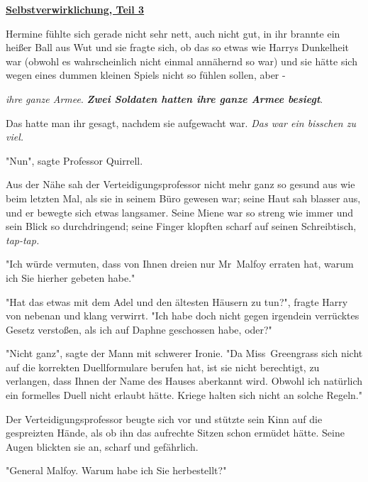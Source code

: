 

\hypertarget{selbstverwirklichung-teil-3}{%

\textbf{\uline{Selbstverwirklichung, Teil 3}}

Hermine fühlte sich gerade nicht sehr nett, auch nicht gut, in ihr brannte ein heißer Ball aus Wut und sie fragte sich, ob das so etwas wie Harrys Dunkelheit war (obwohl es wahrscheinlich nicht einmal annähernd so war) und sie hätte sich wegen eines dummen kleinen Spiels nicht so fühlen sollen, aber -

\emph{ihre ganze Armee}. \textbf{\emph{Zwei Soldaten hatten ihre ganze Armee besiegt}}.

Das hatte man ihr gesagt, nachdem sie aufgewacht war. \emph{Das war ein bisschen zu viel.}

"Nun", sagte Professor Quirrell.

Aus der Nähe sah der Verteidigungsprofessor nicht mehr ganz so gesund aus wie beim letzten Mal, als sie in seinem Büro gewesen war; seine Haut sah blasser aus, und er bewegte sich etwas langsamer. Seine Miene war so streng wie immer und sein Blick so durchdringend; seine Finger klopften scharf auf seinen Schreibtisch, \emph{tap-tap.}

"Ich würde vermuten, dass von Ihnen dreien nur Mr~Malfoy erraten hat, warum ich Sie hierher gebeten habe."

"Hat das etwas mit dem Adel und den ältesten Häusern zu tun?", fragte Harry von nebenan und klang verwirrt. "Ich habe doch nicht gegen irgendein verrücktes Gesetz verstoßen, als ich auf Daphne geschossen habe, oder?"

"Nicht ganz", sagte der Mann mit schwerer Ironie. "Da Miss~Greengrass sich nicht auf die korrekten Duellformulare berufen hat, ist sie nicht berechtigt, zu verlangen, dass Ihnen der Name des Hauses aberkannt wird. Obwohl ich natürlich ein formelles Duell nicht erlaubt hätte. Kriege halten sich nicht an solche Regeln."

Der Verteidigungsprofessor beugte sich vor und stützte sein Kinn auf die gespreizten Hände, als ob ihn das aufrechte Sitzen schon ermüdet hätte. Seine Augen blickten sie an, scharf und gefährlich.

"General Malfoy. Warum habe ich Sie herbestellt?"

}
